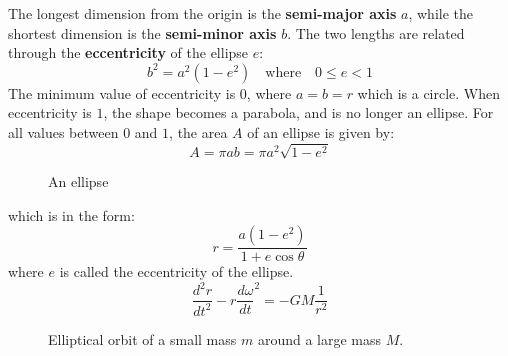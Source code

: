 \documentclass[11pt]{article}
\newcommand{\mb}[1]{
  \ensuremath\mathbf{#1}
}
\begin{document}
The longest dimension from the origin is the \textbf{semi-major axis} $a$, while
the shortest dimension is the \textbf{semi-minor axis} $b$. The two lengths are
related through the \textbf{eccentricity} of the ellipse $e$:
\begin{equation}
  b^2=a^2(1-e^2)\quad\text{where}\quad 0\leq e < 1
\end{equation}
The minimum value of eccentricity is $0$, where $a=b=r$ which is a circle. When
eccentricity is $1$, the shape becomes a parabola, and is no longer an ellipse.
For all values between $0$ and $1$, the area $A$ of an ellipse is given by:
\begin{equation}
  A=\pi ab=\pi a^2\sqrt{1-e^2}
  \label{A2}
\end{equation}

\begin{figure}[!h]
  \centering
  \caption{An ellipse}
  \label{ellipse}
\end{figure}

which is in the form:
\begin{equation}
  r=\frac{a(1-e^2)}{1+e\cos\theta}
\end{equation}
where $e$ is called the eccentricity of the ellipse.
\begin{equation}
  \frac{d^2r}{dt^2} - r\frac{d\omega}{dt}^2 = -GM\frac{1}{r^2}
  \label{differential}
\end{equation}


\begin{figure}[!ht]
  \centering
  \caption{Elliptical orbit of a small mass $m$ around a large mass $M$.}
  \label{eorbit}
\end{figure}
\end{document}
